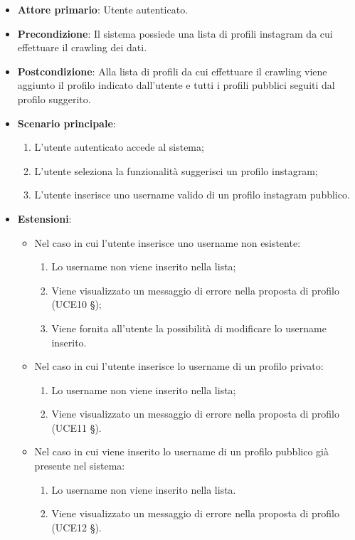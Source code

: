 \begin{itemize}
    \item \textbf{Attore primario}: Utente autenticato.
    \item \textbf{Precondizione}: Il sistema possiede una lista di profili instagram da cui effettuare il crawling dei dati.
    \item \textbf{Postcondizione}: Alla lista di profili da cui effettuare il crawling viene aggiunto il profilo indicato dall’utente e tutti i profili pubblici seguiti dal profilo suggerito.
    \item \textbf{Scenario principale}: 
    \begin{enumerate}
        \item L'utente autenticato accede al sistema;
        \item L’utente seleziona la funzionalità suggerisci un profilo instagram;
        \item L’utente inserisce uno username valido di un profilo instagram pubblico.
    \end{enumerate}
    \item \textbf{Estensioni}:
    \begin{itemize}
        \item Nel caso in cui l’utente inserisce uno username non esistente:
        \begin{enumerate}
            \item Lo username non viene inserito nella lista;
            \item Viene visualizzato un messaggio di errore nella proposta di profilo (UCE10 §);
            \item Viene fornita all’utente la possibilità di modificare lo username inserito.
        \end{enumerate}
        \item Nel caso in cui l’utente inserisce lo username di un profilo privato:
        \begin{enumerate}
            \item Lo username non viene inserito nella lista;
            \item Viene visualizzato un messaggio di errore nella proposta di profilo (UCE11 §).
        \end{enumerate}
        \item Nel caso in cui viene inserito lo username di un profilo pubblico già presente nel sistema:
        \begin{enumerate}
            \item Lo username non viene inserito nella lista.
            \item Viene visualizzato un messaggio di errore nella proposta di profilo (UCE12 §).
        \end{enumerate} 
    \end{itemize}
\end{itemize}

